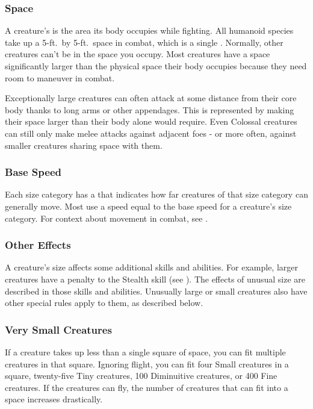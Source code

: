         \subsubsection{Space}\label{Space}
            A creature's  is the area its body occupies while fighting.
            All humanoid species take up a 5-ft.\ by 5-ft.\ space in combat, which is a single .
            Normally, other creatures can't be in the space you occupy.
            Most creatures have a space significantly larger than the physical space their body occupies because they need room to maneuver in combat.

            Exceptionally large creatures can often attack at some distance from their core body thanks to long arms or other appendages.
            This is represented by making their space larger than their body alone would require.
            Even Colossal creatures can still only make melee attacks against adjacent foes - or more often, against smaller creatures sharing space with them.

        \subsubsection{Base Speed}\label{Base Speed}
            Each size category has a  that indicates how far creatures of that size category can generally move.
            Most  use a speed equal to the base speed for a creature's size category.
            For context about movement in combat, see .

        \subsubsection{Other Effects}
            A creature's size affects some additional skills and abilities.
            For example, larger creatures have a penalty to the Stealth skill (see ).
            The effects of unusual size are described in those skills and abilities.
            Unusually large or small creatures also have other special rules apply to them, as described below.

        \subsubsection{Very Small Creatures}
             If a creature takes up less than a single square of space, you can fit multiple creatures in that square.
            Ignoring flight, you can fit four Small creatures in a square, twenty-five Tiny creatures, 100 Diminuitive creatures, or 400 Fine creatures.
            If the creatures can fly, the number of creatures that can fit into a space increases drastically.

